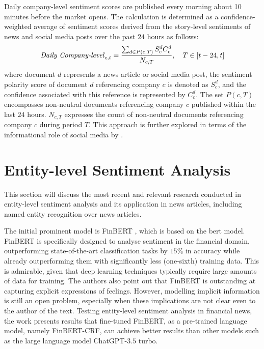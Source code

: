 Daily company-level sentiment scores are published every morning about 10 minutes before the market opens. The calculation is determined as a confidence-weighted average of sentiment scores derived from the story-level sentiments of news and social media posts over the past $24$ hours as follows:
\begin{equation}
    \label{eq:daily-company-level-sentiment}
    \text{\textit{Daily Company-level}}_{c,t} = \frac{\sum_{d \in P(c,T)} S_{c}^{d} C_{c}^{d}}{N_{c,T}}, \quad T \in [t-24, t]
\end{equation} where document $d$ represents a news article or social media post, the sentiment polarity score of document $d$ referencing company $c$ is denoted as $S_{c}^{d}$, and the confidence associated with this reference is represented by $C_{c}^{d}$. The set $P(c,T)$ encompasses non-neutral documents referencing company $c$ published within the last $24$ hours. $N_{c,T}$ expresses the count of non-neutral documents referencing company $c$ during period $T$. This approach is further explored in terms of the informational role of social media by \textcite{chenInformationalRole}.

\section{Entity-level Sentiment Analysis}
\label{sec:entity-level-sentiment-analysis}
This section will discuss the most recent and relevant research conducted in entity-level sentiment analysis and its application in news articles, including named entity recognition over news articles.

The initial prominent model is FinBERT \parencite{araci2019finbert}, which is based on the \acrfull{bert} model. FinBERT is specifically designed to analyse sentiment in the financial domain, outperforming state-of-the-art classification tasks by $15\%$ in accuracy while already outperforming them with significantly less (one-sixth) training data. This is admirable, given that deep learning techniques typically require large amounts of data for training. The authors also point out that FinBERT is outstanding at capturing explicit expressions of feelings. However, modelling implicit information is still an open problem, especially when these implications are not clear even to the author of the text. Testing entity-level sentiment analysis in financial news, the work \parencite{tang-etal-2023-finentity} presents results that fine-tuned FinBERT, as a pre-trained language model, namely FinBERT-CRF, can achieve better results than other models such as the large language model ChatGPT-$3.5$ turbo.
  

